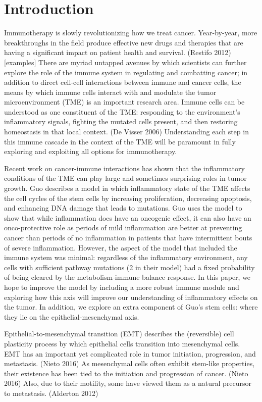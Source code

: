 \documentclass{article}
\begin{document}
\section{Introduction}
Immunotherapy is slowly revolutionizing how we treat cancer.
Year-by-year, more breakthroughs in the field produce effective new drugs and therapies that are having a significant impact on patient health and survival. (Restifo 2012)  [examples] 
There are myriad untapped avenues by which scientists can further explore the role of the immune system in regulating and combatting cancer; in addition to direct cell-cell interactions between immune and cancer cells, the means by which immune cells interact with and modulate the tumor microenvironment (TME) is an important research area. Immune cells can be understood as one constituent of the TME: responding to the environment's inflammatory signals, fighting the mutated cells present, and then restoring homeostasis in that local context. (De Visser 2006)
Understanding each step in this immune cascade in the context of the TME will be paramount in fully exploring and exploiting all options for immunotherapy.

Recent work on cancer-immune interactions has shown that the inflammatory conditions of the TME can play large and sometimes surprising roles in tumor growth.
Guo describes a model in which inflammatory state of the TME affects the cell cycles of the stem cells by increasing proliferation, decreasing apoptosis, and enhancing DNA damage that leads to mutations.
Guo uses the model to show that while inflammation does have an oncogenic effect, it can also have an onco-protective role as periods of mild inflammation are better at preventing cancer than periods of no inflammation in patients that have intermittent bouts of severe inflammation.
However, the aspect of the model that included the immune system was minimal: regardless of the inflammatory environment, any cells with sufficient pathway mutations (2 in their model) had a fixed probability of being cleared by the metabolism-immune balance response. 
In this paper, we hope to improve the model by including a more robust immune module and exploring how this axis will improve our understanding of inflammatory effects on the tumor.
In addition, we explore an extra component of Guo's stem cells: where they lie on the epithelial-mesenchymal axis.

Epithelial-to-mesenchymal transition (EMT) describes the (reversible) cell plasticity process by which epithelial cells transition into mesenchymal cells.
EMT has an important yet complicated role in tumor initiation, progression, and metastasis. (Nieto 2016) %
As mesenchymal cells often exhibit stem-like properties, their existence has been tied to the initiation and progression of cancer. (Nieto 2016) %
Also, due to their motility, some have viewed them as a natural precursor to metastasis. (Alderton 2012) 
\end{document}
